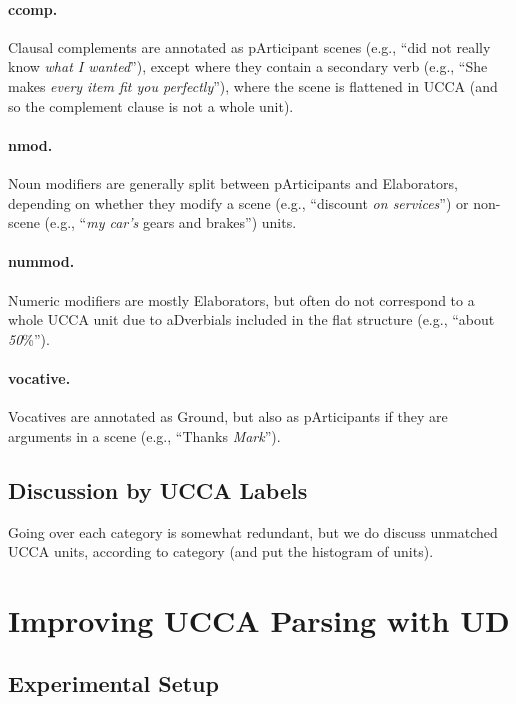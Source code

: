 \documentclass[11pt,a4paper]{article}
\begin{document}
\paragraph{ccomp.}
Clausal complements are annotated as pArticipant scenes
(e.g., ``did not really know \textit{what I wanted}''),
except where they contain a secondary verb
(e.g., ``She makes \textit{every item fit you perfectly}''),
where the scene is flattened in UCCA (and so the complement clause is not a whole unit).

\paragraph{nmod.}
Noun modifiers are generally split between pArticipants and Elaborators,
depending on whether they modify a scene (e.g., ``discount \textit{on services}'')
or non-scene (e.g., ``\textit{my car's} gears and brakes'') units.

\paragraph{nummod.}
Numeric modifiers are mostly Elaborators, but often do not correspond to a whole UCCA unit
due to aDverbials included in the flat structure (e.g., ``about \textit{50}\%'').

\paragraph{vocative.}
Vocatives are annotated as Ground, but also as pArticipants if they are arguments in a scene
(e.g., ``Thanks \textit{Mark}'').



\subsection{Discussion by UCCA Labels}

Going over each category is somewhat redundant, but we do discuss unmatched UCCA units, according to category (and put the histogram of units).



\section{Improving UCCA Parsing with UD}\label{}

\subsection{Experimental Setup}\label{sec:experiments}
\end{document}
